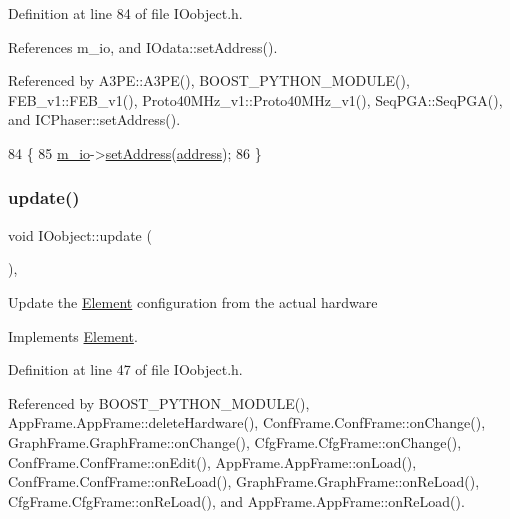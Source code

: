 Definition at line 84 of file I\+Oobject.\+h.



References m\+\_\+io, and I\+Odata\+::set\+Address().



Referenced by A3\+P\+E\+::\+A3\+P\+E(), B\+O\+O\+S\+T\+\_\+\+P\+Y\+T\+H\+O\+N\+\_\+\+M\+O\+D\+U\+L\+E(), F\+E\+B\+\_\+v1\+::\+F\+E\+B\+\_\+v1(), Proto40\+M\+Hz\+\_\+v1\+::\+Proto40\+M\+Hz\+\_\+v1(), Seq\+P\+G\+A\+::\+Seq\+P\+G\+A(), and I\+C\+Phaser\+::set\+Address().


\begin{DoxyCode}
84                               \{
85     \hyperlink{classIOobject_aa648e4128c3c37d8291d6bb26b57c504}{m\_io}->\hyperlink{classIOdata_af98cbfbc28346ebb9b64ca0203af1463}{setAddress}(\hyperlink{classIOobject_a95f0d3f092ea1ae3037ac60f0674d095}{address});
86   \}
\end{DoxyCode}
\mbox{\label{classIOobject_a0100b4ddcfe8f0b551a3f0dc5201988d}} 
\subsubsection{\texorpdfstring{update()}{update()}}
{\footnotesize\ttfamily void I\+Oobject\+::update (\begin{DoxyParamCaption}{ }\end{DoxyParamCaption})\hspace{0.3cm}{\ttfamily [inline]}, {\ttfamily [virtual]}}

Update the \hyperlink{classElement}{Element} configuration from the actual hardware 

Implements \hyperlink{classElement_a4e6c83efae95616ebddd03c793a26661}{Element}.



Definition at line 47 of file I\+Oobject.\+h.



Referenced by B\+O\+O\+S\+T\+\_\+\+P\+Y\+T\+H\+O\+N\+\_\+\+M\+O\+D\+U\+L\+E(), App\+Frame.\+App\+Frame\+::delete\+Hardware(), Conf\+Frame.\+Conf\+Frame\+::on\+Change(), Graph\+Frame.\+Graph\+Frame\+::on\+Change(), Cfg\+Frame.\+Cfg\+Frame\+::on\+Change(), Conf\+Frame.\+Conf\+Frame\+::on\+Edit(), App\+Frame.\+App\+Frame\+::on\+Load(), Conf\+Frame.\+Conf\+Frame\+::on\+Re\+Load(), Graph\+Frame.\+Graph\+Frame\+::on\+Re\+Load(), Cfg\+Frame.\+Cfg\+Frame\+::on\+Re\+Load(), and App\+Frame.\+App\+Frame\+::on\+Re\+Load().



